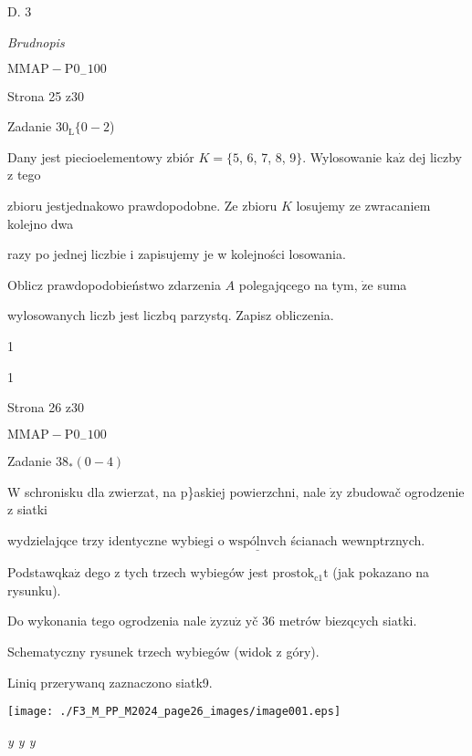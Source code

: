 \documentclass[a4paper,12pt]{article}
\begin{document}
D. 3

{\it Brudnopis}

$\mathrm{M}\mathrm{M}\mathrm{A}\mathrm{P}-\mathrm{P}0_{-}100$

Strona 25 z30





Zadanie $30_{\mathrm{L}}\{0-2$)

Dany jest piecioelementowy zbiór $K=\{5$, 6, 7, 8, 9$\}$. Wylosowanie $\mathrm{k}\mathrm{a}\dot{\mathrm{z}}$ dej liczby z tego

zbioru jestjednakowo prawdopodobne. Ze zbioru $K$ losujemy ze zwracaniem kolejno dwa

razy po jednej liczbie i zapisujemy je w kolejności losowania.

Oblicz prawdopodobieństwo zdarzenia $A$ polegajqcego na tym, $\dot{\mathrm{z}}\mathrm{e}$ suma

wylosowanych liczb jest liczbq parzystq. Zapisz obliczenia.

1

1

Strona 26 z30

$\mathrm{M}\mathrm{M}\mathrm{A}\mathrm{P}-\mathrm{P}0_{-}100$





Zadanie $38_{*}(0-4)$

$\mathrm{W}$ schronisku dla zwierzat, na $\mathrm{p}$\}askiej powierzchni, nale $\dot{\mathrm{z}}\mathrm{y}$ zbudowač ogrodzenie z siatki

wydzielajqce trzy identyczne wybiegi o $\underline{\mathrm{w}\mathrm{s}\mathrm{p}\text{ó} \mathrm{l}\mathrm{n}\mathrm{v}\mathrm{c}\mathrm{h}}$ ścianach wewnptrznych.

Podstawq$\mathrm{k}\mathrm{a}\dot{\mathrm{z}}$ dego z tych trzech wybiegów jest $\mathrm{p}\mathrm{r}\mathrm{o}\mathrm{s}\mathrm{t}\mathrm{o}\mathrm{k}_{\mathrm{c}1}\mathrm{t}$ (jak pokazano na rysunku).

Do wykonania tego ogrodzenia nale $\dot{\mathrm{z}}\mathrm{y}\mathrm{z}\mathrm{u}\dot{\mathrm{z}}$ yč 36 metrów biezqcych siatki.

Schematyczny rysunek trzech wybiegów (widok z góry).

Liniq przerywanq zaznaczono siatk9.
\begin{center}
\texttt{[image: ./F3\_M\_PP\_M2024\_page26\_images/image001.eps]}
\end{center}
{\it y y  y}
\end{document}
